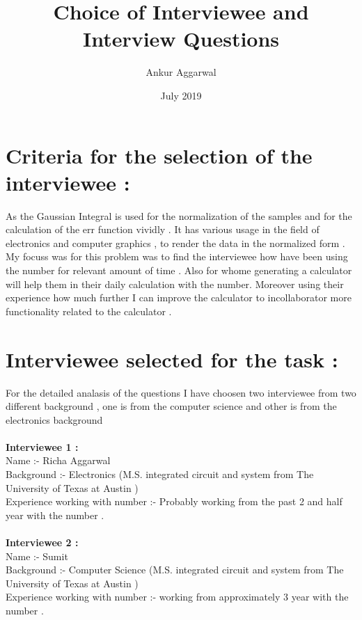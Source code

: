 \documentclass{article}
\title{\centering  Choice of Interviewee and Interview Questions }
\author{\centering Ankur Aggarwal }
\date{July 2019}
\begin{document}
\maketitle
\section*{\textbf{ Criteria for the selection of the interviewee  :}}
\begin{flushleft}
\hrulefill
\end{flushleft}
\noindent As the Gaussian Integral is used for the normalization of the samples and for the calculation of the err function vividly . It has various usage in the field of electronics and computer graphics , to render the data in the normalized form . My focuss was for this problem was to find the interviewee how have been using the number for relevant amount of time . Also for whome generating a calculator will help them in their daily calculation with the number. Moreover using their experience how much further I can improve the calculator to incollaborator more functionality related to the calculator . 
\section*{\textbf{ Interviewee selected for the task :}}
\begin{flushleft}
\hrulefill
\end{flushleft}
\noindent For the detailed analasis of the questions I have choosen two interviewee from two different background , one is from the computer science and other is from the electronics background
\\
\\ \textbf{Interviewee 1 :}
\\ Name :- Richa Aggarwal 
\\ Background :- Electronics (M.S. integrated circuit and system from The University of Texas at Austin )
\\ Experience working with number :- Probably working from the past 2 and half year with the number .
\\
\\ \textbf{Interviewee 2 :}
\\ Name :- Sumit 
\\ Background :- Computer Science (M.S. integrated circuit and system from The University of Texas at Austin )
\\ Experience working with number :- working from approximately 3 year with the number .
\end{document}
